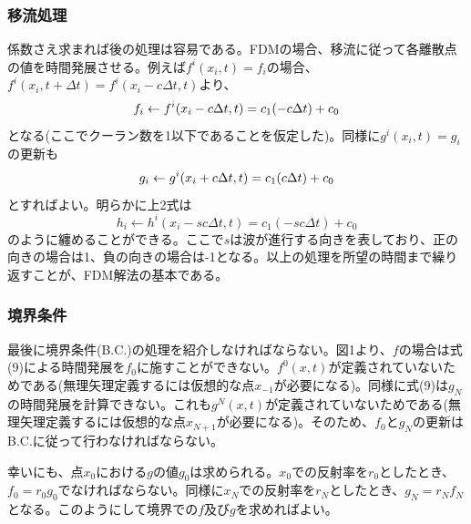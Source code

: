 \documentclass[dvipdfmx, 9pt, a4paper]{jsarticle}
\begin{document}
\begin{table}[b]
\begin{center}
\caption{FDMにおける係数(表中$h$は列毎に$f$もしくは$g$に置き換える)}
\end{center}
\end{table}

\subsubsection{移流処理}
係数さえ求まれば後の処理は容易である。FDMの場合、移流に従って各離散点の値を時間発展させる。例えば$f^i(x_i, t)=f_i$の場合、$f^i(x_i, t+\Delta t)=f^i(x_i-c\Delta t, t)$より、
\begin{equation}
f_i \leftarrow f^i(x_i-c\Delta t, t) = c_1(-c\Delta t)+c_0 \notag
\end{equation}
となる(ここでクーラン数を1以下であることを仮定した)。同様に$g^i(x_i, t)=g_i$の更新も
\begin{equation}
g_i \leftarrow g^i(x_i+c\Delta t, t) = c_1(c\Delta t)+c_0 \notag
\end{equation}
とすればよい。明らかに上2式は
\begin{equation}
h_i \leftarrow h^i(x_i - sc\Delta t, t) = c_1(- sc\Delta t) + c_0
\end{equation}
のように纏めることができる。ここで$s$は波が進行する向きを表しており、正の向きの場合は1、負の向きの場合は-1となる。以上の処理を所望の時間まで繰り返すことが、FDM解法の基本である。

\subsubsection{境界条件}
最後に境界条件(B.C.)の処理を紹介しなければならない。図1より、$f$の場合は式(9)による時間発展を$f_0$に施すことができない。$f^0(x, t)$が定義されていないためである(無理矢理定義するには仮想的な点$x_{-1}$が必要になる)。同様に式(9)は$g_N$の時間発展を計算できない。これも$g^N(x, t)$が定義されていないためである(無理矢理定義するには仮想的な点$x_{N+1}$が必要になる)。そのため、$f_0$と$g_N$の更新はB.C.に従って行わなければならない。\par
幸いにも、点$x_0$における$g$の値$g_0$は求められる。$x_0$での反射率を$r_0$としたとき、$f_0=r_0g_0$でなければならない。同様に$x_N$での反射率を$r_N$としたとき、$g_N=r_Nf_N$となる。このようにして境界での$f$及び$g$を求めればよい。
\end{document}
